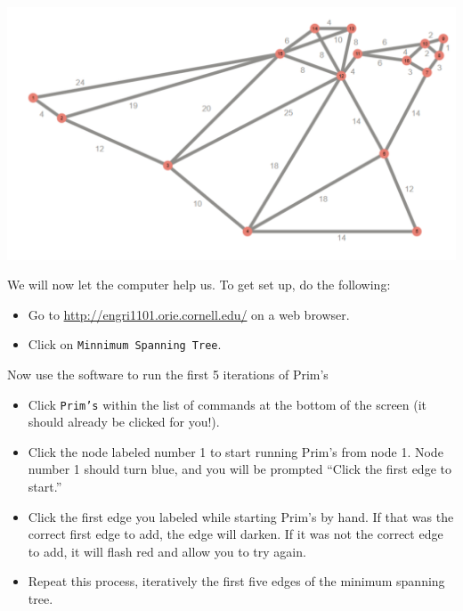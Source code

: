 \documentclass[fullpage,fleqn,leqno]{article}
\begin{document}
\vspace*{3\baselineskip}

\begin{center}
  \includegraphics[width=.9\textwidth]{EmptyMST.pdf}
\end{center}

\vspace*{3\baselineskip}
\newpage
We will now let the computer help us.  To get set up, do the following:
\begin{itemize}
 \item Go to \url{http://engri1101.orie.cornell.edu/} on a web browser. 

\item Click on \texttt{Minnimum Spanning Tree}.
\end{itemize}

\vspace*{\baselineskip}

Now use the software to run the first 5 iterations of Prim's

\begin{itemize}
\item Click \texttt{Prim's} within the list of commands at the bottom of the screen (it should already be clicked for you!).
\item Click the node labeled number 1 to start running Prim's from node 1.  Node number 1 should turn blue, and you will be prompted ``Click the first edge to start.''
\item Click the first edge you labeled while starting Prim's by hand.  If that was the correct first edge to add, the edge will darken.  If it was not the correct edge to add, it will flash red and allow you to try again.
\item Repeat this process, iteratively the first five edges of the minimum spanning tree.
\end{itemize}
\end{document}
